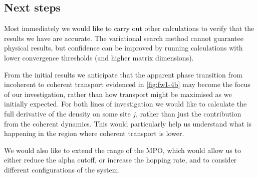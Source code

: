 \subsection{Next steps}
Most immediately we would like to carry out other calculations to verify that the results we have are accurate. The variational search method cannot guarantee physical results, but confidence can be improved by running calculations with lower convergence thresholds (and higher matrix dimensions).

From the initial results we anticipate that the apparent phase transition from incoherent to coherent transport evidenced in \cref{fig:fw1-4b} may become the focus of our investigation, rather than how transport might be maximised as we initially expected. For both lines of investigation we would like to calculate the full derivative of the density on some site \(j\), rather than just the contribution from the coherent dynamics. This would particularly help us understand what is happening in the region where coherent transport is lower.

We would also like to extend the range of the MPO, which would allow us to either reduce the alpha cutoff, or increase the hopping rate, and to consider different configurations of the system.
